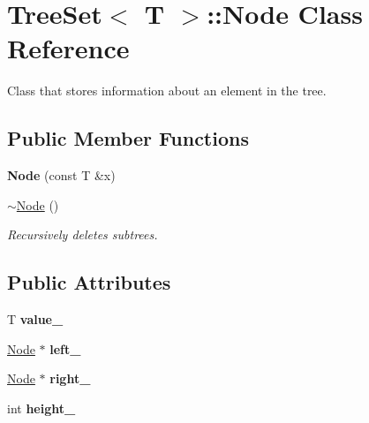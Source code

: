 \hypertarget{class_tree_set_1_1_node}{\section{Tree\-Set$<$ T $>$\-:\-:Node Class Reference}
\label{class_tree_set_1_1_node}
}


Class that stores information about an element in the tree.  


\subsection*{Public Member Functions}
\begin{DoxyCompactItemize}
\item 
\hypertarget{class_tree_set_1_1_node_aa1cc5ccf4ccd83cef2cce3c4e997b809}{{\bfseries Node} (const T \&x)}\label{class_tree_set_1_1_node_aa1cc5ccf4ccd83cef2cce3c4e997b809}

\item 
\hypertarget{class_tree_set_1_1_node_a4e4ac47b0a96808448280fb9b7331030}{\hyperlink{class_tree_set_1_1_node_a4e4ac47b0a96808448280fb9b7331030}{$\sim$\-Node} ()}\label{class_tree_set_1_1_node_a4e4ac47b0a96808448280fb9b7331030}

\begin{DoxyCompactList}\small\item\em Recursively deletes subtrees. \end{DoxyCompactList}\end{DoxyCompactItemize}
\subsection*{Public Attributes}
\begin{DoxyCompactItemize}
\item 
\hypertarget{class_tree_set_1_1_node_a6617530db02b2548423f9e509ea48800}{T {\bfseries value\-\_\-}}\label{class_tree_set_1_1_node_a6617530db02b2548423f9e509ea48800}

\item 
\hypertarget{class_tree_set_1_1_node_a39e0fcfe30ba521c400734a2acdfe59c}{\hyperlink{class_tree_set_1_1_node}{Node} $\ast$ {\bfseries left\-\_\-}}\label{class_tree_set_1_1_node_a39e0fcfe30ba521c400734a2acdfe59c}

\item 
\hypertarget{class_tree_set_1_1_node_a4fac1f38c4727f108cdc732224afc34c}{\hyperlink{class_tree_set_1_1_node}{Node} $\ast$ {\bfseries right\-\_\-}}\label{class_tree_set_1_1_node_a4fac1f38c4727f108cdc732224afc34c}

\item 
\hypertarget{class_tree_set_1_1_node_a717d750139268bc9b2f8f1994c42efa1}{int {\bfseries height\-\_\-}}\label{class_tree_set_1_1_node_a717d750139268bc9b2f8f1994c42efa1}

\end{DoxyCompactItemize}


